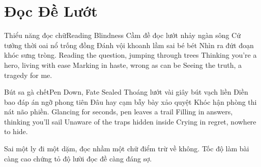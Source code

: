 \chapter{Đọc Đề Lướt}

\begin{tutuyetbox}{Thiểu năng đọc chữ}{Reading Blindness}
Cầm đề đọc lướt nhảy ngàn sông
Cứ tưởng thời oai nổ trống đồng
Đánh vội khoanh lầm sai bé bét
Nhìn ra đứt đoạn khóc sưng tròng.
\tcblower
Reading the question, jumping through trees 
Thinking you're a hero, living with ease 
Marking in haste, wrong as can be 
Seeing the truth, a tragedy for me.
\end{tutuyetbox}

\begin{tutuyetbox}{Bút sa gà chết}{Pen Down, Fate Sealed}
Thoáng lướt vài giây bút vạch liền
Điền bao đáp án ngỡ phong tiên
Đâu hay cạm bẫy bày xảo quyệt
Khóc hận phòng thi nát não phiền.
\tcblower
Glancing for seconds, pen leaves a trail 
Filling in answers, thinking you'll sail 
Unaware of the traps hidden inside 
Crying in regret, nowhere to hide.
\end{tutuyetbox}

\begin{ghichu}
Sai một ly đi một dặm, đọc nhầm một chữ điểm trừ về không. Tốc độ làm bài càng cao chứng tỏ độ lười đọc đề càng đáng sợ.
\end{ghichu}